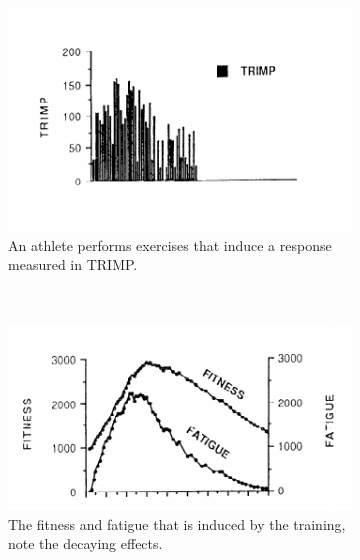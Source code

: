 \begin{figure}[ht]
    \centering
    \begin{subfigure}[t]{0.48\textwidth}
        \centering
        \includegraphics[width=\textwidth]{chapters/figures/background/banister1.pdf}
        \captionsetup{width=.9\linewidth}
        \caption{An athlete performs exercises that induce a response measured in TRIMP.}
    \end{subfigure}%
    ~ 
    \begin{subfigure}[t]{0.48\textwidth}
        \centering
        \includegraphics[width=\textwidth]{chapters/figures/background/banister2.pdf}
        \captionsetup{width=.9\linewidth}
        \caption{The fitness and fatigue that is induced by the training, note the decaying effects.}
    \end{subfigure}\\[1ex]
    \begin{subfigure}[t]{0.48\textwidth}
        \centering

\end{subfigure}
\end{figure}

